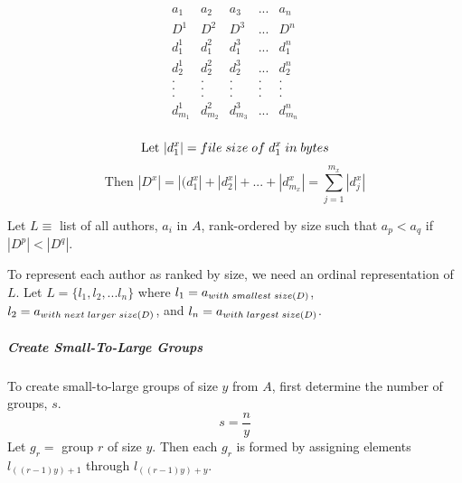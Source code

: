 	\begin{equation}\label{eqn:author_doc_array}
	\begin{array}{lllll}
	a_1 		& a_2 		& a_3 		& ... 	& a_n		\\
	D^1 		& D^2 		& D^3 		& ... 	& D^n		\\
	d_1^1 		& d_1^2		& d_1^3		& ...	& d_1^n		\\
	d_2^1		& d_2^2		& d_2^3		& ...	& d_2^n		\\
	.		& .		& .		& .	& . 		\\
	.		& .		& .		& .	& .		\\
	.		& .		& .		& .	& .		\\
	d_{m_1}^1	& d_{m_2}^2	& d_{m_3}^3	& ...	& d_{m_n}^n	\\
	\end{array}
	\end{equation}
	
	\begin{equation} \text{Let } |d_1^x| = file \thickspace size \thickspace of \thickspace d_1^x \thickspace in \thickspace bytes\end{equation} 
	\begin{equation} \text{Then } |D^x| = |(d_1^x| + |d_2^x| + ... + |d_{m_x}^x| = \sum_{j=1}^{m_x} |d_j^x|\end{equation}
	
	Let $L \equiv$ list of all authors, $a_i$ in $A$, rank-ordered by size such that $a_p < a_q$ if $|D^p| < |D^q|$.
	
	To represent each author as ranked by size, we need an ordinal representation of $L$. Let $L = \{ l_1, l_2, ... l_n \}$ where $l_1=a_{with \thickspace smallest \thickspace size(D)}$, $l_2=a_{with \thickspace next \thickspace larger \thickspace size(D)}$, and $l_n = a_{with \thickspace largest \thickspace size(D)}$.
	
	\subparagraph{Create Small-To-Large Groups}
	To create small-to-large groups of size $y$ from $A$, first determine the number of groups, $s$.
	\begin{equation} s=\frac{n}{y}\end{equation}
	Let $g_r=$ group $r$ of size $y$.  Then each $g_r$ is formed by assigning elements $l_{((r-1)y)+1}$ through $l_{((r-1)y)+y}$.
	

	

